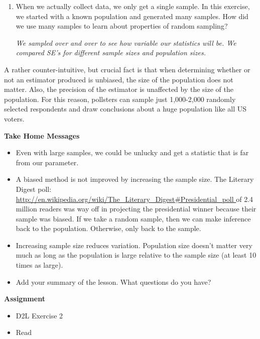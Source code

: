 \begin{enumerate}
     \item When we actually collect data, we only get a single sample.
       In this exercise, we started with a known population and
       generated many samples. How did we use many samples to learn
       about properties of random sampling?
\begin{students}
  \vspace{4cm}
\end{students}    
\begin{key}
   {\it  We sampled over and over to see how variable our statistics
     will be.  We compared SE's for different sample sizes and
     population sizes. }
\end{key}

  \end{enumerate}

  A rather counter-intuitive, but  crucial fact is that when
  determining whether or not an estimator produced is unbiased, the
  size of the population does not matter. Also, the precision of the
  estimator is unaffected by the size of the population. For this
  reason, pollsters can  sample just 1,000-2,000 randomly selected
  respondents and draw conclusions about a huge population like all US
  voters. 

  \begin{center}
    {\bf Take Home Messages}
  \end{center}
 
  \begin{itemize}
  \item Even with large samples, we could be unlucky and get a
    statistic that is far from our parameter.
  \item A biased method is not improved by increasing the sample size.
    The Literary Digest poll:\\
    \url{http://en.wikipedia.org/wiki/The_Literary_Digest#Presidential_poll
    } of 2.4 million
    readers was way off in projecting the presidential winner because
    their sample was biased.
    If we take a random sample, then we can make inference back to the
    population. Otherwise, only back to the sample.

  \item Increasing sample size reduces variation.  Population size
    doesn't matter very  much as long as the population is large
    relative to the sample size (at least 10 times as large).
  \item Add your summary of the lesson.  What questions do you have?
  \end{itemize}\vspace{\fill}


{\bf Assignment}\\
\begin{itemize}
\item  D2L Exercise 2\\
\item Read 
\end{itemize}

